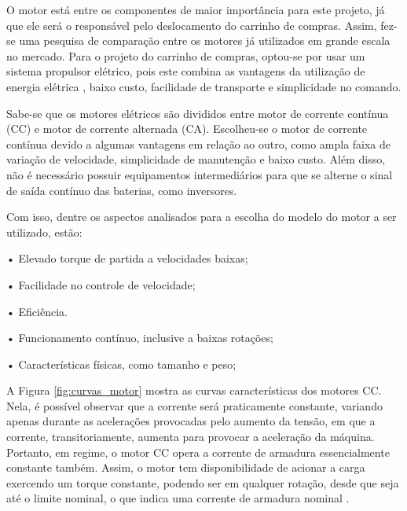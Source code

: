 \par O motor está entre os componentes de maior importância para este projeto, já que ele será o responsável pelo deslocamento do carrinho de compras. Assim, fez-se uma pesquisa	de comparação entre os motores já utilizados em grande escala no mercado.
Para o projeto do carrinho de compras, optou-se por usar um sistema propulsor elétrico, pois este combina as vantagens da utilização de energia elétrica	, baixo custo, facilidade de transporte e simplicidade no comando. \cite{maqel}
\par Sabe-se que os motores elétricos são divididos entre motor de corrente contínua (CC) e motor de corrente alternada (CA). Escolheu-se o motor de corrente contínua devido a algumas vantagens em relação ao outro, como ampla faixa de variação de velocidade, simplicidade de manutenção e baixo custo. Além disso, não é necessário possuir equipamentos intermediários para que se alterne o sinal de saída contínuo das baterias, como inversores.
\par Com isso, dentre os aspectos analisados para a escolha do modelo do motor a ser utilizado, estão:
\par•	Elevado torque de partida a velocidades baixas;
\par•	Facilidade no controle de velocidade;
\par•	Eficiência.
\par•	Funcionamento contínuo, inclusive a baixas rotações;
\par•	Características físicas, como tamanho e peso;

\par A Figura \ref{fig:curvas_motor} mostra as curvas características dos motores CC. Nela, é possível observar que a corrente será praticamente constante, variando apenas durante as acelerações provocadas pelo aumento da tensão, em que a corrente, transitoriamente, aumenta para provocar a aceleração da máquina. Portanto, em regime, o motor CC opera a corrente de armadura essencialmente constante também. Assim, o motor tem disponibilidade de acionar a carga exercendo um torque constante, podendo ser em qualquer rotação, desde que seja até o limite nominal, o que indica uma corrente de armadura nominal \cite{prentice}.

